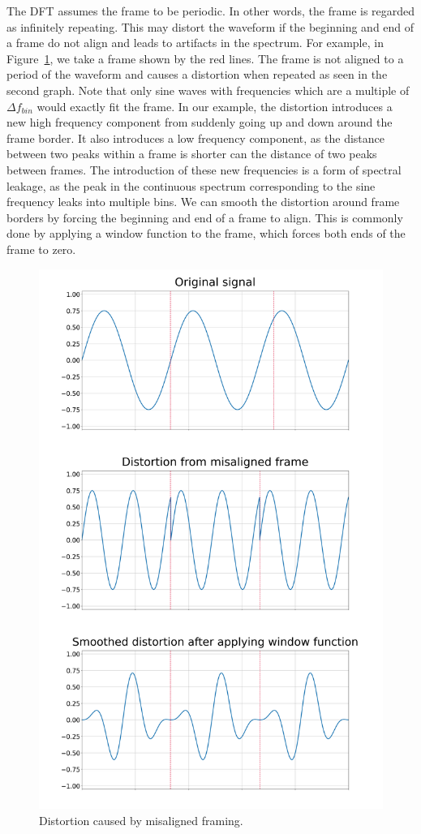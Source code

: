 \documentclass[a4paper,10pt,twocolumn]{article}
\begin{document}
The DFT assumes the frame to be periodic. In other words, the frame is regarded as infinitely repeating. This may distort the waveform if the beginning and end of a frame do not align and leads to artifacts in the spectrum. For example, in Figure~\ref{fig:framedistortion}, we take a frame shown by the red lines. The frame is not aligned to a period of the waveform and causes a distortion when repeated as seen in the second graph. Note that only sine waves with frequencies which are a multiple of $\Delta f_{bin}$ would exactly fit the frame. In our example, the distortion introduces a new high frequency component from suddenly going up and down around the frame border. It also introduces a low frequency component, as the distance between two peaks within a frame is shorter can the distance of two peaks between frames. The introduction of these new frequencies is a form of spectral leakage, as the peak in the continuous spectrum corresponding to the sine frequency leaks into multiple bins. We can smooth the distortion around frame borders by forcing the beginning and end of a frame to align. This is commonly done by applying a window function to the frame, which forces both ends of the frame to zero.
\begin{figure}[h]
    \centering
    \includegraphics[width=\linewidth]{fig/framedistortion.png}
    \caption{Distortion caused by misaligned framing.}
    \label{fig:framedistortion}
\end{figure}
\end{document}
